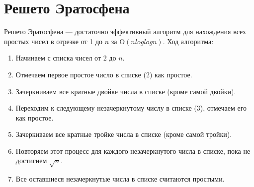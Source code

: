 \documentclass[12pt, a4paper, openany]{book}
\begin{document}
\section{Решето Эратосфена}

Решето Эратосфена --- достаточно эффективный алгоритм для нахождения всех простых чисел в отрезке от 1 до $n$ за $\text{O}(nloglogn)$. Ход алгоритма:

\begin{enumerate}
    \item Начинаем с списка чисел от 2 до $n$.
    \item Отмечаем первое простое число в списке (2) как простое.
    \item Зачеркниваем все кратные двойке числа в списке (кроме самой двойки).
    \item Переходим к следующему незачеркнутому числу в списке (3), отмечаем его как простое.
    \item Зачеркиваем все кратные тройке числа в списке (кроме самой тройки).
    \item Повторяем этот процесс для каждого незачеркнутого числа в списке, пока не достигнем $\sqrt{n}$.
    \item Все оставшиеся незачеркнутые числа в списке считаются простыми.
\end{enumerate}
\end{document}
